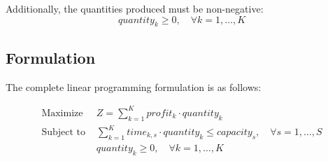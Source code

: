\documentclass{article}
\begin{document}
Additionally, the quantities produced must be non-negative:
\[
quantity_{k} \geq 0, \quad \forall k = 1, \ldots, K
\]

\subsection*{Formulation}
The complete linear programming formulation is as follows:

\begin{align*}
\text{Maximize } & Z = \sum_{k=1}^{K} profit_{k} \cdot quantity_{k} \\
\text{Subject to } & \sum_{k=1}^{K} time_{k,s} \cdot quantity_{k} \leq capacity_{s}, \quad \forall s = 1, \ldots, S \\
                   & quantity_{k} \geq 0, \quad \forall k = 1, \ldots, K
\end{align*}
\end{document}
